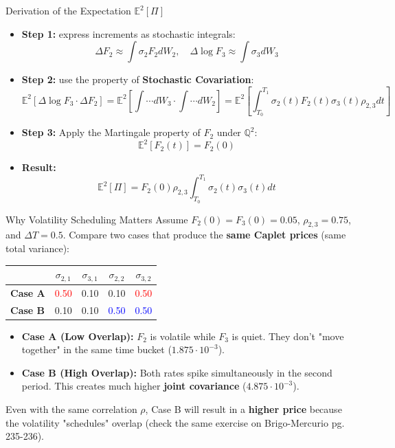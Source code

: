 \documentclass{beamer}
\begin{document}
\begin{frame}{Derivation of the Expectation $\mathbb{E}^2[\Pi]$}
	\begin{itemize}
		\item \textbf{Step 1:} express increments as stochastic integrals:
		\[ \Delta F_2 \approx \int \sigma_2 F_2 dW_2, \quad \Delta \log F_3 \approx \int \sigma_3 dW_3 \]
		\item \textbf{Step 2:} use the property of \textbf{Stochastic Covariation}:
		\[ \mathbb{E}^2[\Delta \log F_3 \cdot \Delta F_2] =
		\mathbb{E}^2 \left[ \int \cdots dW_3 \cdot \int \cdots dW_2 \right] =
		\mathbb{E}^2 \left[ \int_{T_0}^{T_1} \sigma_2(t) F_2(t) \sigma_3(t) \rho_{2,3} dt \right] \]
		\item \textbf{Step 3:} Apply the Martingale property of $F_2$ under $\mathbb{Q}^2$:
		\[ \mathbb{E}^2[F_2(t)] = F_2(0) \]
		\item \textbf{Result:}
		\[ \mathbb{E}^2[\Pi] = F_2(0) \rho_{2,3} \int_{T_0}^{T_1} \sigma_2(t) \sigma_3(t) dt \]
	\end{itemize}
\end{frame}

\begin{frame}{Why Volatility Scheduling Matters}
	Assume $F_2(0)=F_3(0)=0.05$, $\rho_{2,3}=0.75$, and $\Delta T = 0.5$.
	Compare two cases that produce the \textbf{same Caplet prices} (same total variance):

	\vspace{0.4cm}
	\begin{center}
		\renewcommand{\arraystretch}{1.2} %
		\begin{tabular}{lcccc}
			\toprule
			& \textbf{$\sigma_{2,1}$} & \textbf{$\sigma_{3,1}$} & \textbf{$\sigma_{2,2}$} & \textbf{$\sigma_{3,2}$} \\
			\midrule
			\textbf{Case A} & \textcolor{red}{0.50} & 0.10 & 0.10 & \textcolor{red}{0.50} \\
			\textbf{Case B} & 0.10 & 0.10 & \textcolor{blue}{0.50} & \textcolor{blue}{0.50} \\
			\bottomrule
		\end{tabular}
	\end{center}
	\vspace{0.4cm}

	\begin{itemize}
		\item \textbf{Case A (Low Overlap):} $F_2$ is volatile while $F_3$ is quiet. They don't "move together" in the same time bucket ($1.875\cdot 10^{-3}$).
		\item \textbf{Case B (High Overlap):} Both rates spike simultaneously in the second period. This creates much higher \textbf{joint covariance} ($4.875\cdot 10^{-3}$).
	\end{itemize}

	Even with the same correlation $\rho$, Case B will result in a \textbf{higher price} because the volatility "schedules" overlap (check the same exercise on Brigo-Mercurio pg. 235-236).
\end{frame}
\end{document}
